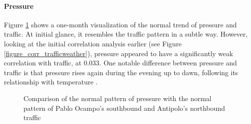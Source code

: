 \paragraph{Pressure}

Figure \ref{figure_traffic_vs_pressure} shows a one-month visualization of the normal trend of pressure and traffic. At initial glance, it resembles the traffic pattern in a subtle way. However, looking at the initial correlation analysis earlier (see Figure \ref{figure_corr_trafficweather}), pressure appeared to have a significantly weak correlation with traffic, at 0.033. One notable difference between pressure and traffic is that pressure rises again during the evening up to dawn, following its relationship with temperature .


\begin{figure}[!t] 
\centering
    \centering
      \captionsetup{justification=centering}
    \hfill
    \caption{Comparison of the normal pattern of pressure with the normal pattern of Pablo Ocampo’s southbound and Antipolo’s northbound traffic}

    \label{figure_traffic_vs_pressure}
\end{figure}


